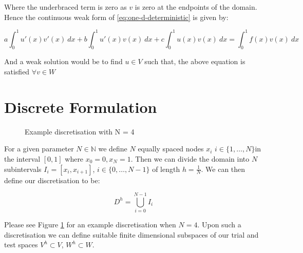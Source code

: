 Where the underbraced term is zero as $v$ is zero at the endpoints of the domain. Hence the
continuous weak form of \ref{eq:one-d-deterministic} is given by:

\begin{equation}\label{eq:wk-oned-deterministic}
	a\int_0^1{u'(x)v'(x)\ dx} + b\int_0^1{u'(x)v(x)\ dx} + c\int_0^1{u(x)v(x)\ dx} = 
    \int_0^1{f(x)v(x)\ dx}
\end{equation}

And a weak solution would be to find $u \in V$ such that, the above equation is 
satisfied $\forall v \in W$

\section{Discrete Formulation}

\begin{figure}
\centering
{}
\caption{Example discretisation with N = 4}
\label{fig:one-d-discretisation}
\end{figure}

For a given parameter $N \in \mathbb{N}$ we define $N$ equally spaced nodes $x_i$ 
$i \in \{1, \ldots, N\} $in the interval $[0,1]$ where $x_0 = 0, x_N = 1$. Then we
can divide the domain into $N$ subintervals $ I_i = [x_i, x_{i+1}]$,
$i \in \{0,\ldots,N - 1\}$ of length $h = \frac{1}{N}$. We can then define our 
discretisation to be:

\[
	D^h = \bigcup_{i=0}^{N - 1} I_i
\]

Please see Figure \ref{fig:one-d-discretisation} for an example discretisation when $N=4$.
Upon such a discretisation we can define suitable finite dimensional subspaces of our trial and
test spaces $V^h \subset V$, $W^h \subset W$.

